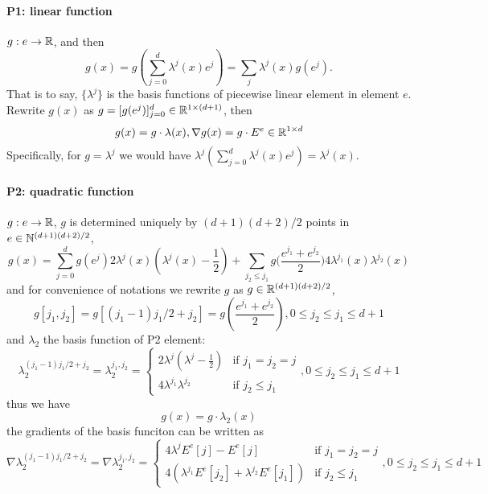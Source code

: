 \paragraph{P1: linear function} $g:e\to\mathbb{R}$, and then
\[g(x)=g({\textstyle\sum_{j=0}^{d}}\lambda^j(x)e^j)=\sum_{j}\lambda^j(x)g(e^j).\]
That is to say, $\{\lambda^j\}$ is the basis functions of piecewise linear element in element $e$. 
Rewrite $g(x)$ as $g=[g(e^j)]_{j=0}^d\in\mathbb{R}^{1\times(d+1)}$, then 
\[g(x)=g\cdot\lambda(x),\nabla g(x)=g\cdot E^e\in\mathbb{R}^{1\times d}\]
Specifically, for $g=\lambda^j$ we would have $\lambda^j(\sum_{j=0}^{d}\lambda^j(x)e^j)=\lambda^j(x)$.

\paragraph{P2: quadratic function} $g:e\to\mathbb{R}$, 
$g$ is determined uniquely by $(d+1)(d+2)/2$ points in 
$e\in\mathbb{N}^{(d+1)(d+2)/2}$, 
\[g(x)=\sum_{j=0}^dg(e^j)2\lambda^j(x)(\lambda^j(x)-\frac12)+
\sum_{j_2\leq j_1}g\big(\frac{e^{j_1}+e^{j_2}}2\big)4\lambda^{j_1}(x)\lambda^{j_2}(x)\]
and for convenience of notations we rewrite $g$ as $g\in\mathbb{R}^{(d+1)(d+2)/2}$, 
\begin{equation}\label{eq:quadratic-freedom}
  g[j_1,j_2]=g[(j_1-1)j_1/2+j_2]=g(\frac{e^{j_1}+e^{j_2}}2), 0\leq j_2\leq j_1\leq d+1
\end{equation}
and $\lambda_2$ the basis function of P2 element:
\[
  \lambda_2^{(j_1-1)j_1/2+j_2}=\lambda_2^{j_1,j_2}=\left\{
  \begin{array}{ll}
    2\lambda^j(\lambda^j-\frac12) & \text{if } j_1=j_2=j \\
    4\lambda^{j_1}\lambda^{j_2}   & \text{if } j_2\leq j_1
  \end{array}
  \right., 0\leq j_2\leq j_1\leq d+1
\]
thus we have
\[g(x)=g\cdot\lambda_2(x)\]
the gradients of the basis funciton can be written as
\[
  \nabla\lambda_2^{(j_1-1)j_1/2+j_2}=\nabla\lambda_2^{j_1,j_2}=\left\{
  \begin{array}{ll}
    4\lambda^jE^e[j]-E^e[j]                        & \text{if } j_1=j_2=j \\
    4(\lambda^{j_1}E^e[j_2]+\lambda^{j_2}E^e[j_1]) & \text{if } j_2\leq j_1
  \end{array}
  \right., 0\leq j_2\leq j_1\leq d+1
\]
